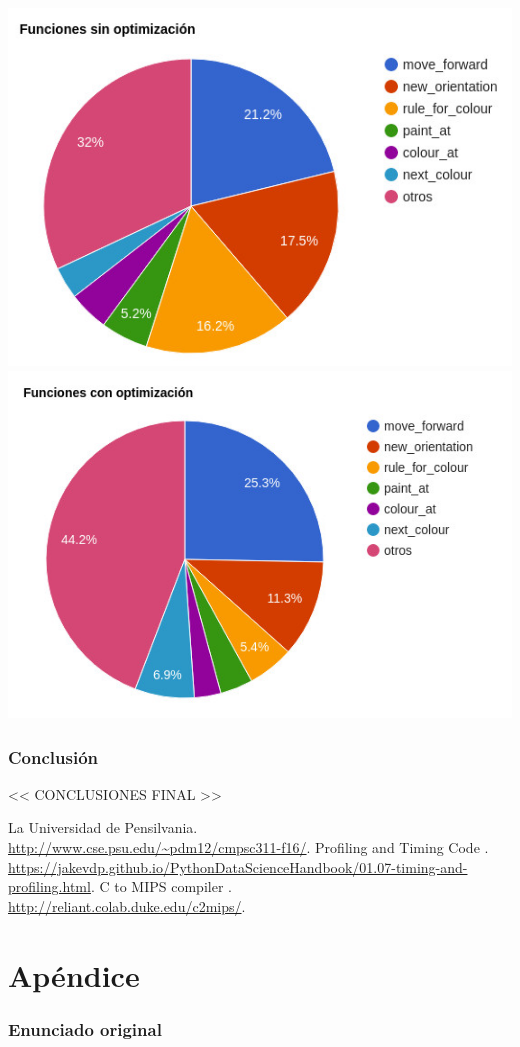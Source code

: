 \documentclass[a4paper, 10pt, twoside, notitlepage]{article}
\begin{document}
\includegraphics[scale=3]{chart.jpg} \\

\includegraphics[scale=3]{chart2.jpg} \\

\newpage

\section{Conclusión}
<< CONCLUSIONES FINAL >>


\vspace{.5cm}
\begin{thebibliography}{5}
 \bibitem{} La Universidad de Pensilvania.\\ \url{http://www.cse.psu.edu/~pdm12/cmpsc311-f16/}.
 \bibitem{} Profiling and Timing Code
.\\ \url{https://jakevdp.github.io/PythonDataScienceHandbook/01.07-timing-and-profiling.html}.
 \bibitem{} C to MIPS compiler
.\\ \url{http://reliant.colab.duke.edu/c2mips/}.
\end{thebibliography}

\clearpage

\part{Apéndice}
\appendix

\section{Enunciado original}\label{sec:enunciado}

\end{document}
